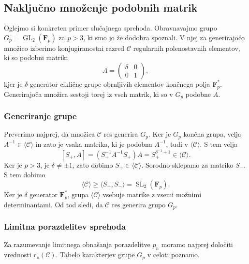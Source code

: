 \documentclass[11pt]{book}
\def\conclass{\mathcal{C}}
\def\FF{\mathbf{F}}
\DeclareMathOperator\GL{GL}
\DeclareMathOperator\SL{SL}
\theoremstyle{definition}
\theoremstyle{zgled}
\theoremstyle{odprtproblem}
\theoremstyle{domacanaloga}
\theoremstyle{izrek}
\begin{document}
\subsection{Naključno množenje podobnih matrik}

Oglejmo si konkreten primer slučajnega sprehoda. Obravnavajmo grupo $G_p = \GL_2(\FF_p)$ za $p > 3$, ki smo jo že dodobra spoznali. V njej za generirajočo množico izberimo konjugiranostni razred $\conclass$ regularnih polenostavnih elementov, ki so podobni matriki
\[
    A = \begin{pmatrix}
        \delta & 0 \\ 0 & 1 
    \end{pmatrix},
\] 
kjer je $\delta$ generator ciklične grupe obrnljivih elementov končnega polja $\FF_p^*$. Generirajoča množica sestoji torej iz vseh matrik, ki so v $G_p$ podobne $A$.

\subsubsection{Generiranje grupe}

Preverimo najprej, da množica $\conclass$ res generira $G_p$. Ker je $G_p$ končna grupa, velja $A^{-1} \in \langle \conclass \rangle$ in zato je vsaka matrika, ki je podobna $A^{-1}$, tudi v $\langle \conclass \rangle$. S tem velja
\[
    [S_+, A] = (S_+^{-1} A^{-1} S_+) A  = S_+^{\delta^{-1} + 1}
    \in \langle \conclass \rangle.
\]
Ker je $p > 3$, je $\delta \neq \pm 1$, zato dobimo $S_+ \in \langle \conclass \rangle$. Sorodno sklepamo za matriko $S_-$. S tem dobimo
\[
    \textstyle \langle \conclass \rangle \geq \langle S_+, S_- \rangle = \SL_2(\FF_p).
\]
Ker je $\delta$ generator $\FF_p^*$, grupa $\langle \conclass \rangle$ vsebuje matrike z vsemi možnimi determinantami. Od tod sledi, da $\conclass$ res generira grupo $G_p$.

\subsubsection{Limitna porazdelitev sprehoda}

Za razumevanje limitnega obnašanja porazdelitve $p_n$ moramo najprej določiti vrednosti $r_{\pi}(\conclass)$. Tabelo karakterjev grupe $G_p$ v celoti poznamo.
\end{document}
